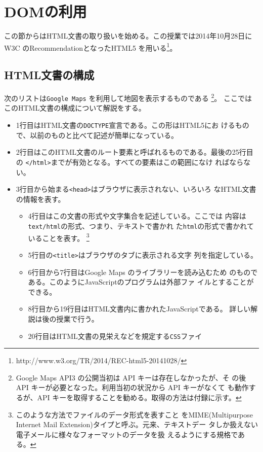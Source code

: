 \newcommand{\Elm}[1]{\texttt{<#1>}}
\chapter{DOMの利用}
この節からはHTML文書の取り扱いを始める。この授業では2014年10月28日にW3C
のRecommendationとなったHTML5
を用いる\footnote{http://www.w3.org/TR/2014/REC-html5-20141028/}。
\section{HTML文書の構成}
\begin{Exec}\upshape\label{ExGoogleMaps}
 次のリストは\texttt{Google Maps} を利用して地図を表示するものである
 \footnote{Google Maps API3 の公開当初は API キーは存在しなかったが、そ
 の後 API キーが必要となった。利用当初の状況から API キーがなくて
 も動作するが、API キーを取得することを勧める。取得の方法は付録に示す。}。
ここではこのHTML文書の構成について解説をする。
\begin{itemize}
 \item 1行目はHTML文書の\texttt{DOCTYPE}宣言である。この形はHTML5にお
       けるもので、以前のものと比べて記述が簡単になっている。
 \item 2行目はこのHTML文書のルート要素と呼ばれるものである。最後の25行目
       の \Elm{/html}までが有効となる。すべての要素はこの範囲になけ
       ればならない。
 \item 3行目から始まる\Elm{head}はブラウザに表示されない、いろいろ
       なHTML文書の情報を表す。
         \begin{itemize}
	  \item 4行目はこの文書の形式や文字集合を記述している。ここでは
		内容は\texttt{text/html}の形式、つまり、テキストで書かれ
		た\texttt{html}の形式で書かれていることを表す。
		\footnote{このような方法でファイルのデータ形式を表すこと
		をMIME(Multipurpose
		Internet Mail Extension)タイプと呼ぶ。元来、テキストデー
		タしか扱えない電子メールに様々なフォーマットのデータを扱
		えるようにする規格である。}
	  \item 5行目の\Elm{title}はブラウザのタブに表示される文字
		列を指定している。
	  \item 6行目から7行目はGoogle Maps のライブラリーを読み込むため
		のものである。このようにJavaScriptのプログラムは外部ファ
		イルとすることができる。
	  \item 8行目から19行目はHTML文書内に書かれたJavaScriptである。
		詳しい解説は後の授業で行う。
	  \item 20行目はHTML文書の見栄えなどを規定する\texttt{CSS}ファイ

\end{itemize}
\end{itemize}
\end{Exec}
